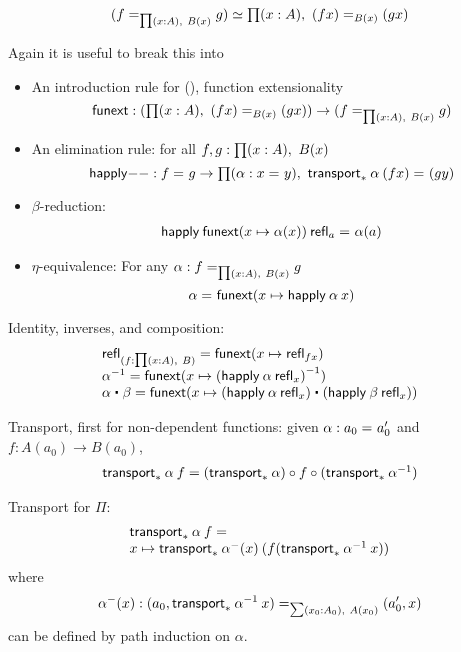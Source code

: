 \[
\eqv{(\id[\prd{x:A} B(x)]{f}{g})}{\prd{x:A} \id[B(x)]{(f x)}{(g x)}}
\]

Again it is useful to break this into 

\begin{itemize}
\item An introduction rule for {()}, function extensionality
  \[
  \funext : (\prd{x:A} \id[B(x)]{(f x)}{(g x)}) \to {(\id[\prd{x:A} B(x)]{f}{g})}
  \]
\item An elimination rule: for all $f,g : \prd{x:A} B(x)$
  \[
  \happly{-}{-} : \id{f}{g} \to \prd{\alpha : \id{x}{y}} \id{\transport{B}{\alpha} \: {(f x)}}{(g y)}
  \]
\item $\beta$-reduction: 
  \[
  \begin{array}{l}
  \id{\happly \: {\funext{(x \mapsto \alpha(x))}} \: {\refl{a}}}{\alpha(a)}
  \end{array}
  \]
\item $\eta$-equivalence: For any $\alpha : \id[\prd{x:A} B(x)] f g$
  \[
  \id{\alpha}{\funext (x \mapsto \happly \: \alpha \: x)}
  \]
\end{itemize}


Identity, inverses, and composition:
\[
\begin{array}{l}
\refl{(f : \prd{x:A} B)} = \funext(x \mapsto \refl{f x}) \\
\opp{\alpha} = \funext (x \mapsto \opp{(\happly \: {\alpha} \: {\refl x})})  \\
{\alpha} \ct \beta = \funext (x \mapsto {(\happly \: {\alpha} \: {\refl x}) \ct (\happly \: {\beta} \: {\refl x})})  \\
\end{array}
\]

\newcommand{\fcomp}{\circ}

Transport, first for non-dependent functions: given $\alpha : \id {a_0} {a_0'}$
and $f : A(a_0) \to B(a_0)$, 
\[
\begin{array}{l}
\transport{x_0:A_0 \mapsto A(x_0) \to B(x_0)}{\alpha} \: f = 
   (\transport{x_0:A_0 \mapsto B(x_0)}{\alpha}) \fcomp f \fcomp (\transport{x:A_0 \mapsto A(x_0)}{\opp \alpha})
\end{array}
\]

Transport for $\Pi$:  
\[
\begin{array}{l}
\transport{x_0:A_0 \mapsto \prd{x : A(x_0)} B(x_0)}{\alpha} \: f =  \\
   x \mapsto 
   \transport{(p : \sm {x_0:A_0} A) \mapsto B(\proj{1} \: p, \proj{2} \: p)}{\alpha^{\mathord{-}}(x) } 
      \: (f (\transport{x:A_0 \mapsto A(x)}{\opp \alpha}\:  x))
\end{array}
\]
where 
\[
\alpha^-(x) : \id[\sm {x_0:A_0} A(x_0)] {(a_0 , \transport{x_0 \mapsto A(x_0)} {\opp \alpha} \: x)} {(a_0' , x)}
\]
can be defined by path induction on $\alpha$.  

